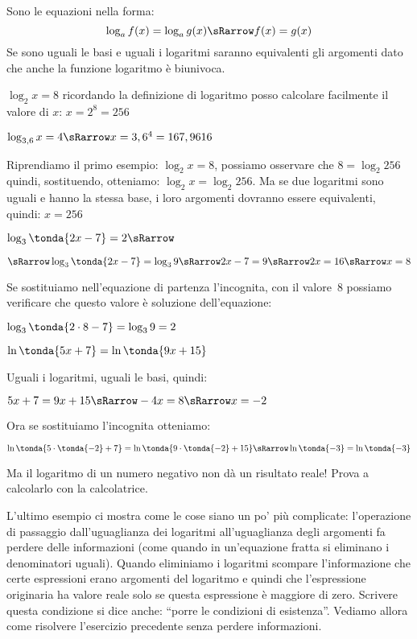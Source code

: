 Sono le equazioni nella forma:
\[\log_a{f(x)} = \log_a{g(x)} \sRarrow f(x) = g(x)\]
Se sono uguali le basi e uguali i logaritmi saranno equivalenti gli argomenti 
dato che anche la funzione logaritmo è biunivoca.

\begin{esempio}
 \(\log_2{x} = 8\) ricordando la definizione di logaritmo posso calcolare 
facilmente il valore di \(x\): \(x = 2^8 = 256\)
\end{esempio}

\begin{esempio}
 \(\log_{3,6}{x} = 4 \sRarrow x = 3,6^4 = 167,9616\)
\end{esempio}

\begin{esempio}
 Riprendiamo il primo esempio: \(\log_2{x} = 8\), possiamo osservare che 
 \(8 = \log_2{256}\) quindi, sostituendo, 
 otteniamo: \(\log_2{x} = \log_2{256}\). Ma se due logaritmi sono uguali e 
hanno la stessa base, i loro argomenti dovranno essere equivalenti, quindi:
\(x = 256\)
\end{esempio}

\begin{esempio}
 \(\log_{3}\tonda{2x-7} = 2 \sRarrow \)
 
 \(\sRarrow \log_{3}\tonda{2x-7} = \log_{3}9 \sRarrow  
2x -7 = 9 \sRarrow 2x = 16 \sRarrow x = 8\)
 
 Se sostituiamo nell'equazione di partenza l'incognita, con il valore~8 
possiamo verificare che questo valore è soluzione dell'equazione:

\(\log_{3}\tonda{2 \cdot 8-7} = \log_{3} 9 = 2\)
\end{esempio}

\begin{esempio}
 \(\ln\tonda{5x +7} = \ln\tonda{9x +15}\)
 
 Uguali i logaritmi, uguali le basi, quindi:
 
 \(5x +7 = 9x +15 \sRarrow -4x = 8 \sRarrow x = -2\)
 
 Ora se sostituiamo l'incognita otteniamo:
 
 \(\ln\tonda{5 \cdot \tonda{-2} +7} = 
   \ln\tonda{9 \cdot \tonda{-2} +15} \sRarrow 
   \ln\tonda{-3} = \ln\tonda{-3}\)
   
 Ma il logaritmo di un numero negativo non dà un risultato reale! Prova a 
calcolarlo con la calcolatrice.
\end{esempio}

L'ultimo esempio ci mostra come le cose siano un po' più complicate: 
l'operazione di passaggio dall'uguaglianza dei logaritmi all'uguaglianza degli 
argomenti fa perdere delle informazioni (come quando in un'equazione fratta si 
eliminano i denominatori uguali). 
Quando eliminiamo i logaritmi scompare l'informazione che certe espressioni 
erano argomenti del logaritmo e quindi che l'espressione originaria ha valore 
reale solo se questa espressione è maggiore di zero. 
Scrivere questa condizione si dice anche: ``porre le condizioni di esistenza''.
Vediamo allora come risolvere l'esercizio precedente senza perdere informazioni.

